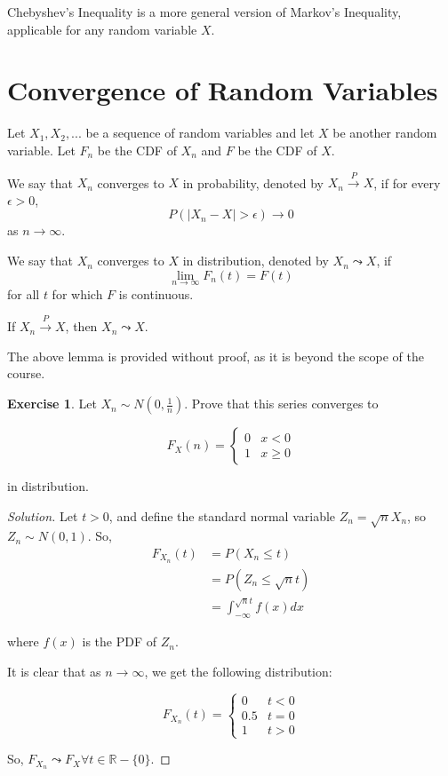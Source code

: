 \documentclass[12pt,letterpaper]{book}
\theoremstyle{definition}
\newtheorem*{exercise}{Exercise}
\newenvironment{solution}
  {\renewcommand\qedsymbol{$\blacksquare$}\begin{proof}[Solution]}
  {\end{proof}}
\newcommand{\R}{\mathbb{R}}
\begin{document}
Chebyshev's Inequality is a more general version of Markov's Inequality, applicable for any random variable $X$.

\section{Convergence of Random Variables}

Let $X_1,X_2,...$ be a sequence of random variables and let $X$ be another random variable. Let $F_n$ be the CDF of $X_n$ and $F$ be the CDF of $X$.

We say that $X_n$ converges to $X$ in probability, denoted by $X_n \xrightarrow{P} X$, if for every $\epsilon > 0$,
\[P(|X_n-X| > \epsilon) \rightarrow 0\]
as $n \rightarrow \infty$.

We say that $X_n$ converges to $X$ in distribution, denoted by $X_n \leadsto X$, if
\[ \lim_{n \rightarrow \infty} F_n(t) = F(t)\]
for all $t$ for which $F$ is continuous.

\begin{lemma}
  If $X_n \xrightarrow{P} X$, then $X_n \leadsto X$.
\end{lemma}

The above lemma is provided without proof, as it is beyond the scope of the course.

\begin{exercise}

Let $X_n \sim N(0,\frac{1}{n})$. Prove that this series converges to 

\[ F_X(n) = \begin{cases}
0 & x < 0 \\
1 & x \geq 0
\end{cases}\]

in distribution. 

\begin{solution}
Let $t > 0$, and define the standard normal variable $Z_n = \sqrt{n}X_n$, so $Z_n \sim N(0,1)$. So,
\begin{align*}
  F_{X_n}(t) &= P(X_n \leq t) \\
             &= P(Z_n \leq \sqrt{n}t) \\
             &= \int_{-\infty} ^{\sqrt{n}t} f(x) dx
\end{align*}

where $f(x)$ is the PDF of $Z_n$.

It is clear that as $n \rightarrow \infty$, we get the following distribution:

\[F_{X_n}(t) = \begin{cases}
  0 & t < 0 \\
  0.5 & t = 0 \\
  1 & t > 0
\end{cases}\]

So, $F_{X_n} \leadsto F_X \forall t \in \R - \{0\}$.
\end{solution}
\end{exercise}
\end{document}
